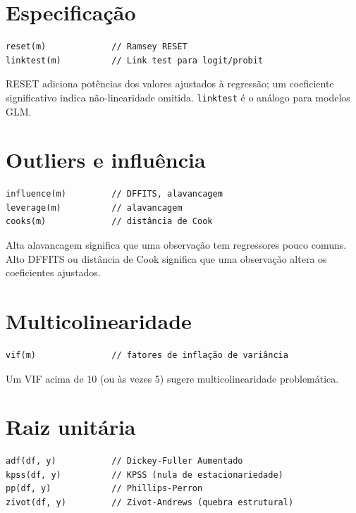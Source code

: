 \section{Especificação}

\begin{lstlisting}[caption={RESET e link test}]
reset(m)             // Ramsey RESET
linktest(m)          // Link test para logit/probit
\end{lstlisting}

RESET adiciona potências dos valores ajustados à regressão; um
coeficiente significativo indica não-linearidade omitida. \texttt{linktest} é
o análogo para modelos GLM.

\section{Outliers e influência}

\begin{lstlisting}[caption={Diagnósticos de influência}]
influence(m)         // DFFITS, alavancagem
leverage(m)          // alavancagem
cooks(m)             // distância de Cook
\end{lstlisting}

Alta alavancagem significa que uma observação tem regressores pouco
comuns. Alto DFFITS ou distância de Cook significa que uma observação
altera os coeficientes ajustados.

\section{Multicolinearidade}

\begin{lstlisting}[caption={VIF}]
vif(m)               // fatores de inflação de variância
\end{lstlisting}

Um VIF acima de 10 (ou às vezes 5) sugere multicolinearidade
problemática.

\section{Raiz unitária}

\begin{lstlisting}[caption={Testes de raiz unitária}]
adf(df, y)           // Dickey-Fuller Aumentado
kpss(df, y)          // KPSS (nula de estacionariedade)
pp(df, y)            // Phillips-Perron
zivot(df, y)         // Zivot-Andrews (quebra estrutural)
\end{lstlisting}

